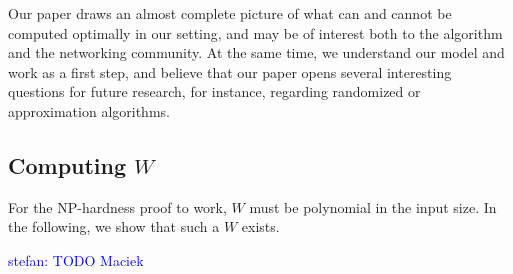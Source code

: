 \documentclass[9pt,twocolumn]{scrartcl}
\newcommand{\stefan}[1]{\textcolor{blue}{stefan: #1}}
\begin{document}


Our paper draws an almost complete picture of what can and cannot be
computed optimally in our setting, and may be of interest both to the algorithm
and the networking community. At the same time, we understand our model and work
as a first step, and believe that our paper opens several interesting
questions for future research, for instance, regarding randomized 
or approximation algorithms.


%



\begin{appendix}



\section{Computing $W$}\label{ap:w}

For the NP-hardness proof to work, $W$ must be polynomial in the input size.
In the following, we show that such a $W$ exists.

\stefan{TODO Maciek}

\end{appendix}
\end{document}
